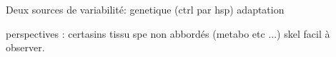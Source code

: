 \documentclass[../main.tex]{subfiles}
\begin{document}
%
%

Deux sources de variabilité:
genetique (ctrl par hsp)
adaptation

perspectives : certasins tissu spe non abbordés (metabo etc ...)
skel facil à observer.



\end{document}
